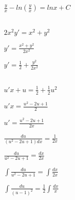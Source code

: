 \documentclass{article}
\begin{document}
\begin{flushleft}
   $\frac{y}{x} - ln(\frac{y}{x}) = lnx + C$\\\\
\end{flushleft}

\begin{center}
\end{center}

\begin{center}
    $2x^2y' = x^2 + y^2$
\end{center}

\begin{flushleft}
   $y' = \frac{x^2 + y^2}{2x^2}$
\end{flushleft}

\begin{flushleft}
   $y' = \frac{1}{2} + \frac{y^2}{2x^2}$\\\\
\end{flushleft}

\begin{center}
\end{center}

\begin{flushleft}
   $u'x + u = \frac{1}{2} + \frac{1}{2}u^2$
\end{flushleft}

\begin{flushleft}
    $u'x = \frac{u^2 - 2u + 1}{2}$
\end{flushleft}

\begin{flushleft}
  $u' = \frac{u^2 - 2u + 1}{2x}$
\end{flushleft}

\begin{flushleft}
   $\frac{du}{(u^2 - 2u + 1)dx} = \frac{1}{2x}$
\end{flushleft}

\begin{flushleft}
   $\frac{du}{u^2 - 2u + 1} = \frac{dx}{2x}$
\end{flushleft}

\begin{flushleft}
   $\int\frac{du}{u^2 - 2u + 1} = \int\frac{dx}{2x}$
\end{flushleft}

\begin{flushleft}
 $\int\frac{du}{(u- 1)^2} = \frac{1}{2} \int\frac{dx}{x}$
\end{flushleft}
\end{document}
